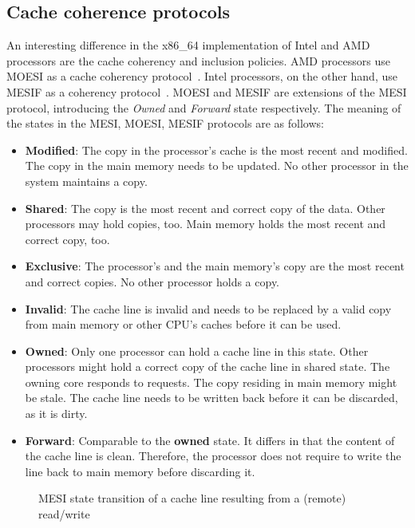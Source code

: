 \subsection{Cache coherence protocols}
\label{sec:state:technical:caches_protocol}
An interesting difference in the x86\_64 implementation of Intel and AMD
processors are the cache coherency and inclusion policies. AMD processors use
MOESI as a cache coherency protocol~\cite{amd_manual}. Intel processors, on the
other hand, use MESIF as a coherency protocol~\cite{thomadakis2011architecture}.
MOESI and MESIF are extensions of the MESI protocol, introducing the
\textit{Owned} and \textit{Forward} state respectively. The meaning of the
states in the MESI, MOESI, MESIF protocols are as follows:
\begin{itemize}
  \item \textbf{Modified}: The copy in the processor's cache is the most
    recent and modified. The copy in the main memory needs to be updated.
    No other processor in the system maintains a copy.
  \item \textbf{Shared}:  The copy is the most recent and correct copy of the
    data. Other processors may hold copies, too. Main memory holds the
    most recent and correct copy, too.
  \item \textbf{Exclusive}: The processor's and the main memory's copy are the
    most recent and correct copies. No other processor holds a copy.
  \item \textbf{Invalid}: The cache line is invalid and needs to be replaced by
    a valid copy from main memory or other CPU's caches before it can be used.
  \item \textbf{Owned}: Only one processor can hold a cache line in this state.
    Other processors might hold a correct copy of the cache line in shared
    state. The owning core responds to requests. The copy residing in main
    memory might be stale. The cache line needs to be written back before it can
    be discarded, as it is dirty.
  \item \textbf{Forward}: Comparable to the \textbf{owned} state. It differs in
    that the content of the cache line is clean. Therefore, the processor does
    not require to write the line back to main memory before discarding it.
\end{itemize}

\begin{figure}
  \begin{center}
    
    \caption{MESI state transition of a cache line resulting from a (remote) read/write}
    \label{fig:state:technical:mesi}
  \end{center}
\end{figure}

